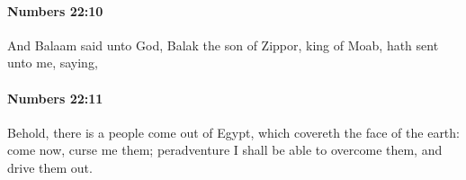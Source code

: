		\paragraph{Numbers 22:10} %
			\label{NUMBERS-22-10}

			And Balaam said unto God, Balak the son of Zippor, king of Moab, hath sent unto me, saying,


		\paragraph{Numbers 22:11} %
			\label{NUMBERS-22-11}

			Behold, there is a people come out of Egypt, which covereth the face of the earth: come now, curse me them; peradventure I shall be able to overcome them, and drive them out.


